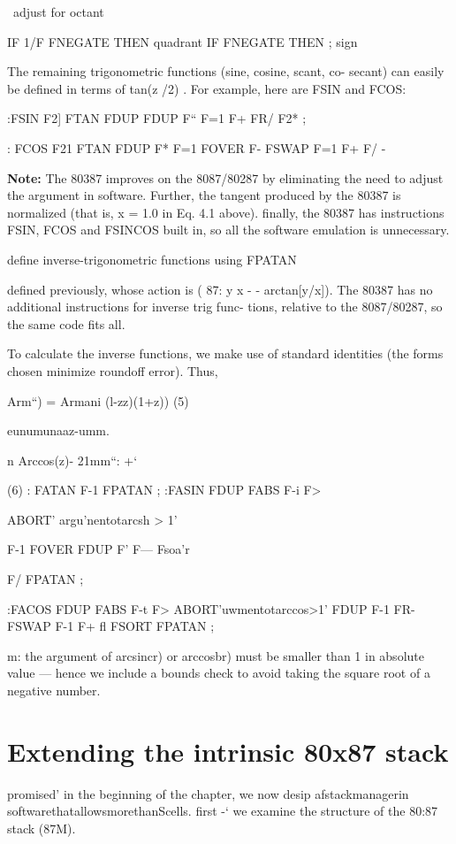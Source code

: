 {{\ adjust for octant

IF 1/F FNEGATE THEN \adjustfor quadrant
IF FNEGATE THEN ; \adjust sign

The remaining trigonometric functions (sine, cosine, scant, co-
secant) can easily be defined in terms of tan(z /2) . For example,
here are FSIN and FCOS:

:FSIN F2] FTAN FDUP FDUP F“ F=1 F+
FR/ F2* ;

: FCOS F21 FTAN FDUP F* F=1 FOVER F-
FSWAP F=1 F+ F/ -

\textbf{Note:} The 80387 improves on the 8087/80287 by eliminating the
need to adjust the argument in software. Further, the tangent
produced by the 80387 is normalized (that is, x = 1.0 in Eq. 4.1
above). finally, the 80387 has instructions FSIN, FCOS and
FSINCOS built in, so all the software emulation is unnecessary.

 define inverse-trigonometric functions using FPATAN

defined previously, whose action is ( 87: y x - - arctan[y/x]).
The 80387 has no additional instructions for inverse trig func-
tions, relative to the 8087/80287, so the same code fits all.

To calculate the inverse functions, we make use of standard
identities (the forms chosen minimize roundoff error). Thus,

Arm“) = Armani (l-zz)(1+z)) (5)

eunumunaaz-umm.

n
Arccos(z)- 21mm“: +‘ } (6)
: FATAN F-1 FPATAN ;
:FASIN FDUP FABS F-i F>

ABORT' argu'nentotarcsh > 1'

F-1 FOVER FDUP F' F— Fsoa'r

F/ FPATAN ;

:FACOS FDUP FABS F-t F>
ABORT'uwmentotarccos>1'
FDUP F-1 FR- FSWAP F-1 F+ fl
FSORT FPATAN ;

m: the argument of arcsincr) or arccosbr) must be smaller than
1 in absolute value — hence we include a bounds check to avoid
taking the square root of a negative number.

 

\section{Extending the intrinsic 80x87 stack}
 promised' in the beginning of the chapter, we now desip
afstackmanagerin softwarethatallowsmorethanScells. first -‘
we examine the structure of the 80:87 stack (87M).

}
